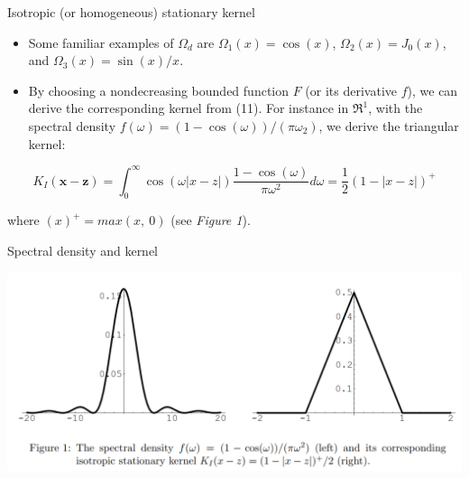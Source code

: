 \documentclass[
  ignorenonframetext,
]{beamer}
\begin{document}
\begin{frame}{Isotropic (or homogeneous) stationary kernel}
\protect\hypertarget{isotropic-or-homogeneous-stationary-kernel-1}{}
\begin{itemize}
\item
  Some familiar examples of \(\Omega_d\) are \(\Omega_1(x) = \cos(x)\),
  \(\Omega_2(x) = J_0(x)\), and \(\Omega_3(x) = \sin(x)/x\).
\item
  By choosing a nondecreasing bounded function \(F\) (or its derivative
  \(f\)), we can derive the corresponding kernel from (11). For instance
  in \(\mathfrak R^1\), with the spectral density
  \(f(\omega) = (1 - \cos(\omega))/(\pi \omega_2)\), we derive the
  triangular kernel:
\end{itemize}

\[
K_I(\pmb x - \pmb z) = \int_0^\infty \cos(\omega|x - z|) \frac {1 - \cos(\omega)} {\pi \omega^2} d\omega = {\frac 1 2} (1 - |x - z|)^+
\]

where \((x)^+ = max(x,\ 0)\) (see \emph{Figure 1}).
\end{frame}

\begin{frame}{Spectral density and kernel}
\protect\hypertarget{spectral-density-and-kernel}{}
\begin{center}\includegraphics[width=0.8\linewidth]{figure/marc_f1} \end{center}
\end{frame}
\end{document}
